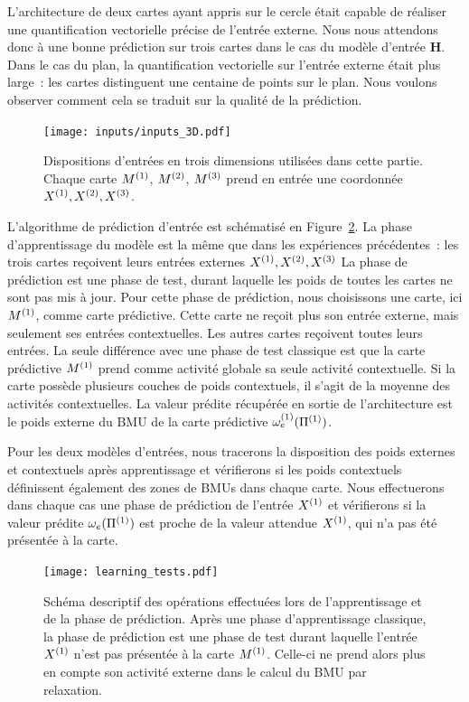 \documentclass[../main]{subfiles}
\begin{document}
L'architecture de deux cartes ayant appris sur le cercle était capable de réaliser une quantification vectorielle précise de l'entrée externe. Nous nous attendons donc à une bonne prédiction sur trois cartes dans le cas du modèle d'entrée \textbf{H}. Dans le cas du plan, la quantification vectorielle sur l'entrée externe était plus large~: les cartes distinguent une centaine de points sur le plan. Nous voulons observer comment cela se traduit sur la qualité de la prédiction.

\begin{figure}[h!]
	\texttt{[image: inputs/inputs\_3D.pdf]}
	\caption{Dispositions d'entrées en trois dimensions utilisées dans cette partie. Chaque carte $M^{({1})}$, $M^{({2})}$, $M^{({3})}$ prend en entrée une coordonnée $X^{({1})}, X^{({2})}, X^{({3})}$. \label{fig:inputs_3D}}
\end{figure}

L'algorithme de prédiction d'entrée est schématisé en Figure~\ref{fig:schema_pred}.
La phase d'apprentissage du modèle est la même que dans les expériences précédentes~: les trois cartes reçoivent leurs entrées externes $X^{({1})},X^{({2})}, X^{({3})} $
La phase de prédiction est une phase de test, durant laquelle les poids de toutes les cartes ne sont pas mis à jour.
Pour cette phase de prédiction, nous choisissons une carte, ici $M^{({1})}$, comme carte prédictive. 
Cette carte ne reçoit plus son entrée externe, mais seulement ses entrées contextuelles. 
Les autres cartes reçoivent toutes leurs entrées.
La seule différence avec une phase de test classique est que la carte prédictive $M^{({1})}$ prend comme activité globale sa seule activité contextuelle. Si la carte possède plusieurs couches de poids contextuels, il s'agit de la moyenne des activités contextuelles.
La valeur prédite récupérée en sortie de l'architecture est le poids externe du BMU de la carte prédictive $\omega_{e}^{({1})}(\Pi^{({1})})$.

Pour les deux modèles d'entrées, nous tracerons la disposition des poids externes et contextuels après apprentissage et vérifierons si les poids contextuels définissent également des zones de BMUs dans chaque carte.
Nous effectuerons dans chaque cas une phase de prédiction de l'entrée $X^{({1})}$ et vérifierons si la valeur prédite $\omega_e(\Pi^{({1})})$ est proche de la valeur attendue $X^{({1})}$, qui n'a pas été présentée à la carte.

\begin{figure}
	\texttt{[image: learning\_tests.pdf]}
	\caption{Schéma descriptif des opérations effectuées lors de l'apprentissage et de la phase de prédiction. Après une phase d'apprentissage classique, la phase de prédiction est une phase de test durant laquelle l'entrée $X^{({1})}$ n'est pas présentée à la carte $M^{({1})}$. Celle-ci ne prend alors plus en compte son activité externe dans le calcul du BMU par relaxation. \label{fig:schema_pred}}
\end{figure}
\end{document}
